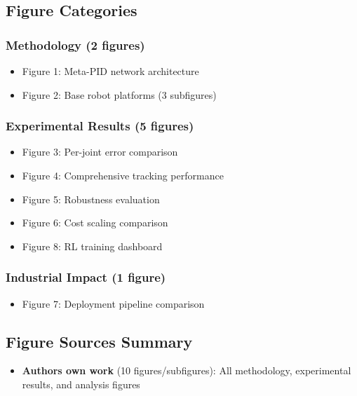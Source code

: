 \documentclass[a4paper,fleqn]{article}
\begin{document}
\subsection{Figure Categories}

\subsubsection{Methodology (2 figures)}
\begin{itemize}
    \item Figure 1: Meta-PID network architecture
    \item Figure 2: Base robot platforms (3 subfigures)
\end{itemize}

\subsubsection{Experimental Results (5 figures)}
\begin{itemize}
    \item Figure 3: Per-joint error comparison
    \item Figure 4: Comprehensive tracking performance
    \item Figure 5: Robustness evaluation
    \item Figure 6: Cost scaling comparison
    \item Figure 8: RL training dashboard
\end{itemize}

\subsubsection{Industrial Impact (1 figure)}
\begin{itemize}
    \item Figure 7: Deployment pipeline comparison
\end{itemize}

\subsection{Figure Sources Summary}
\begin{itemize}
    \item \textbf{Authors own work} (10 figures/subfigures): All methodology, experimental results, and analysis figures
\end{itemize}
\end{document}
